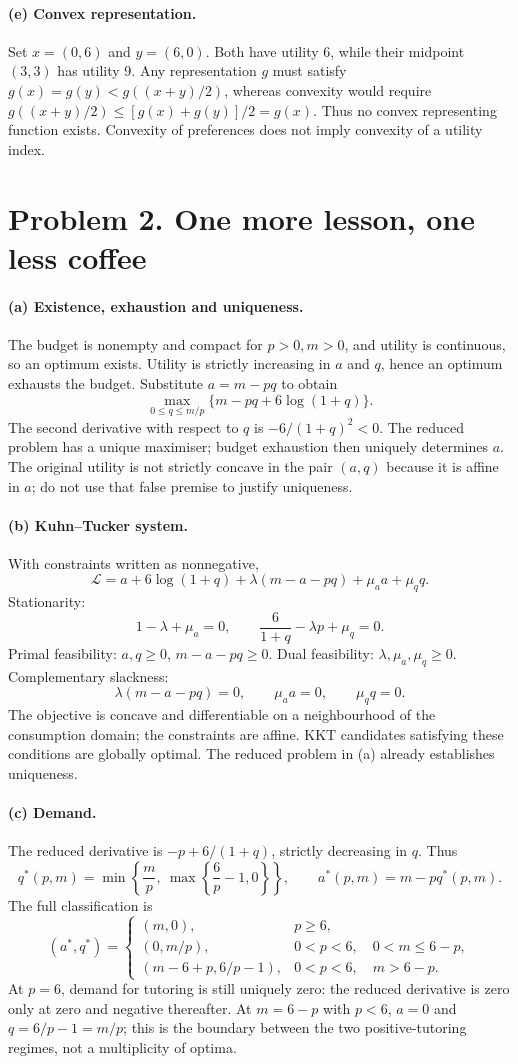 \paragraph{(e) Convex representation.} Set $x=(0,6)$ and $y=(6,0)$. Both have utility 6, while their midpoint $(3,3)$ has utility 9. Any representation $g$ must satisfy $g(x)=g(y)<g((x+y)/2)$, whereas convexity would require $g((x+y)/2)\le[g(x)+g(y)]/2=g(x)$. Thus no convex representing function exists. Convexity of preferences does not imply convexity of a utility index.
\clearpage
\section*{Problem 2. One more lesson, one less coffee}
\paragraph{(a) Existence, exhaustion and uniqueness.} The budget is nonempty and compact for $p>0,m>0$, and utility is continuous, so an optimum exists. Utility is strictly increasing in $a$ and $q$, hence an optimum exhausts the budget. Substitute $a=m-pq$ to obtain
\[
 \max_{0\le q\le m/p}\{m-pq+6\log(1+q)\}.
\]
The second derivative with respect to $q$ is $-6/(1+q)^2<0$. The reduced problem has a unique maximiser; budget exhaustion then uniquely determines $a$. The original utility is not strictly concave in the pair $(a,q)$ because it is affine in $a$; do not use that false premise to justify uniqueness.
\paragraph{(b) Kuhn--Tucker system.} With constraints written as nonnegative,
\[
 \mathcal L=a+6\log(1+q)+\lambda(m-a-pq)+\mu_a a+\mu_q q.
\]
Stationarity:
\[
 1-\lambda+\mu_a=0,\qquad
 \frac6{1+q}-\lambda p+\mu_q=0.
\]
Primal feasibility: $a,q\ge0$, $m-a-pq\ge0$. Dual feasibility: $\lambda,\mu_a,\mu_q\ge0$. Complementary slackness:
\[
 \lambda(m-a-pq)=0,\qquad \mu_a a=0,\qquad\mu_q q=0.
\]
The objective is concave and differentiable on a neighbourhood of the consumption domain; the constraints are affine. KKT candidates satisfying these conditions are globally optimal. The reduced problem in (a) already establishes uniqueness.
\paragraph{(c) Demand.} The reduced derivative is $-p+6/(1+q)$, strictly decreasing in $q$. Thus
\[
 q^*(p,m)=\min\left\{\frac m p,\ \max\left\{\frac6p-1,0\right\}\right\},\qquad
 a^*(p,m)=m-pq^*(p,m).
\]
The full classification is
\[
 (a^*,q^*)=
 \begin{cases}
 (m,0),&p\ge6,\\[1mm]
 (0,m/p),&0<p<6,\quad 0<m\le6-p,\\[1mm]
 (m-6+p,6/p-1),&0<p<6,\quad m>6-p.
 \end{cases}
\]
At $p=6$, demand for tutoring is still uniquely zero: the reduced derivative is zero only at zero and negative thereafter. At $m=6-p$ with $p<6$, $a=0$ and $q=6/p-1=m/p$; this is the boundary between the two positive-tutoring regimes, not a multiplicity of optima.

